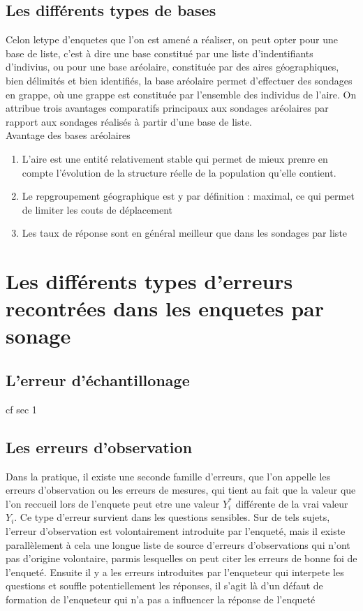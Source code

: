 \documentclass[a4paper]{article}
\begin{document}
\subsection{Les différents types de bases}
Celon letype d'enquetes que l'on est amené a réaliser, on peut opter pour une base de liste, c'est à dire une base constitué par une liste
d'indentifiants d'indivius, ou pour une base aréolaire, constituée par des aires géographiques, bien délimités et bien identifiés, la base aréolaire
permet d'effectuer des sondages en grappe, où une grappe est constituée par l'ensemble des individus de l'aire. On attribue trois avantages
comparatifs principaux aux sondages aréolaires par rapport aux sondages réalisés à partir d'une base de liste.\\
Avantage des bases aréolaires
\begin{enumerate}
    \item L'aire est une entité relativement stable qui permet de mieux prenre en compte l'évolution de la structure réelle de la population 
        qu'elle contient.
    \item Le repgroupement géographique est y par définition : maximal, ce qui permet de limiter les couts de déplacement 
    \item Les taux de réponse sont en général meilleur que dans les sondages par liste
\end{enumerate}
\section{Les différents types d'erreurs recontrées dans les enquetes par sonage}
\subsection{L'erreur d'échantillonage}
cf sec 1
\subsection{Les erreurs d'observation}
Dans la pratique, il existe une seconde famille d'erreurs, que l'on appelle les erreurs d'observation ou les erreurs de mesures, qui tient au fait que
la valeur que l'on reccueil lors de l'enquete peut etre une valeur $Y_i^*$ différente de la vrai valeur $Y_i$. Ce type d'erreur survient dans les
questions sensibles. Sur de tels sujets, l'erreur d'observation est volontairement introduite par l'enqueté, mais il existe parallèlement à cela une
longue liste de source d'erreurs d'observations qui n'ont pas d'origine volontaire, parmis lesquelles on peut citer les erreurs de bonne foi de
l'enqueté. Ensuite il y a les erreurs introduites par l'enqueteur qui interpete les questions et souffle potentiellement les réponses, il s'agit là
d'un défaut de formation de l'enqueteur qui n'a pas a influencer la réponse de l'enqueté 
\end{document}

